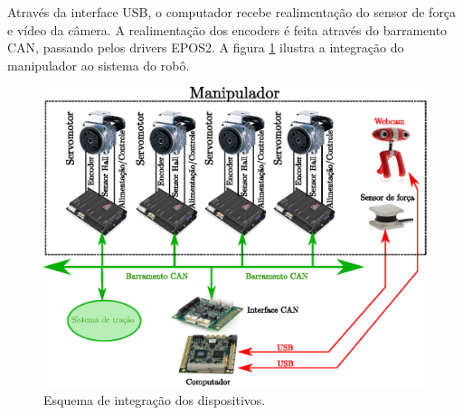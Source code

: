 Através da interface USB, o computador recebe realimentação do sensor de força e vídeo da câmera. A realimentação dos encoders é feita através do barramento CAN, passando pelos drivers EPOS2. A figura \ref{fig:integration} ilustra a integração do manipulador ao sistema do robô.

\begin{figure}[!ht]
\centering
  \includegraphics[width=\linewidth]{./img/integration_diagram}
  \caption{Esquema de integração dos dispositivos.}
  \label{fig:integration}
\end{figure}%